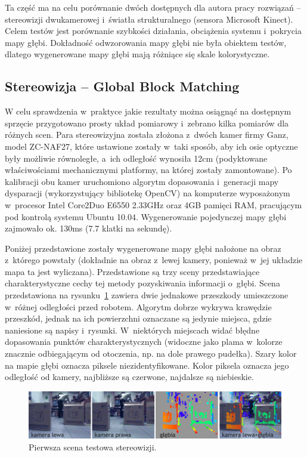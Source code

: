 Ta część ma na celu porównanie dwóch dostępnych dla autora pracy rozwiązań --
stereowizji dwukamerowej i~światła strukturalnego (sensora Microsoft Kinect).
Celem testów jest porównanie szybkości działania, obciążenia systemu i~pokrycia
mapy głębi. Dokładność odwzorowania mapy głębi nie była obiektem testów, dlatego
wygenerowane mapy głębi mają różniące się skale kolorystyczne.

\subsection{Stereowizja -- Global Block Matching}

W celu sprawdzenia w~praktyce jakie rezultaty można osiągnąć na dostępnym sprzęcie
przygotowano prosty układ pomiarowy i~zebrano kilka pomiarów dla różnych scen.
Para stereowizyjna została złożona z~dwóch kamer firmy Ganz, model ZC-NAF27, które
ustawione zostały w~taki sposób, aby ich osie optyczne były możliwie równoległe,
a~ich odległość wynosiła 12cm (podyktowane właściwościami mechanicznymi platformy,
na której zostały zamontowane). Po kalibracji obu kamer uruchomiono algorytm
dopasowania i~generacji mapy dysparacji (wykorzystujący bibliotekę OpenCV) na
komputerze wyposażonym w~procesor Intel Core2Duo E6550 2.33GHz oraz 4GB pamięci
RAM, pracującym pod kontrolą systemu Ubuntu 10.04. Wygenerowanie pojedynczej mapy
głębi zajmowało ok. 130ms (7.7 klatki na sekundę).

Poniżej przedstawione zostały wygenerowane mapy głębi nałożone na obraz z~którego powstały
(dokładnie na obraz z~lewej kamery, ponieważ w~jej układzie mapa ta jest wyliczana).
Przedstawione są trzy sceny przedstawiające charakterystyczne cechy tej metody
pozyskiwania informacji o~głębi. Scena przedstawiona na rysunku~\ref{fig:stereo_1}
zawiera dwie jednakowe przeszkody umieszczone w~różnej odległości przed robotem.
Algorytm dobrze wykrywa krawędzie przeszkód, jednak na ich powierzchni oznaczane
są jedynie miejsca, gdzie naniesione są napisy i~rysunki. W~niektórych miejscach
widać błędne dopasowania punktów charakterystycznych (widoczne jako plama w~kolorze
znacznie odbiegającym od otoczenia, np. na dole prawego pudełka). Szary kolor na
mapie głębi oznacza piksele niezidentyfikowane. Kolor piksela oznacza jego odległość
od kamery, najbliższe są czerwone, najdalsze są niebieskie.

\begin{figure}[h!]
\centering
\includegraphics{../../Common/img/stereo_1}
\caption[Pierwsza scena testowa stereowizji]{Pierwsza scena testowa stereowizji.}
\label{fig:stereo_1}
\end{figure}

